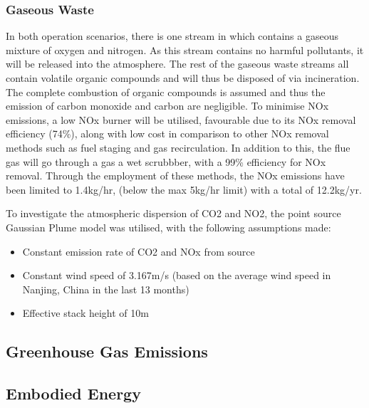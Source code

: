 


\subsubsection{Gaseous Waste}

In both operation scenarios, there is one stream in which contains a gaseous mixture of oxygen and nitrogen. As this stream contains no harmful pollutants, it will be released into the atmosphere. The rest of the gaseous waste streams all contain volatile organic compounds and will thus be disposed of via incineration. The complete combustion of organic compounds is assumed and thus the emission of carbon monoxide and carbon are negligible. To minimise NOx emissions, a low NOx burner will be utilised, favourable due to its NOx removal efficiency (74\%), along with low cost in comparison to other NOx removal methods such as fuel staging and gas recirculation. In addition to this, the flue gas will go through a gas a wet scrubbber, with a 99\% efficiency for NOx removal. Through the employment of these methods, the NOx emissions have been limited to 1.4kg/hr, (below the max 5kg/hr limit) with a total of 12.2kg/yr. 

To investigate the atmospheric dispersion of CO2 and NO2, the point source Gaussian Plume model was utilised, with the following assumptions made:

\begin{itemize}
\item Constant emission rate of CO2 and NOx from source
\item Constant wind speed of 3.167m/s (based on the average wind speed in Nanjing, China in the last 13 months)
\item  Effective stack height of 10m 
\end{itemize}







\subsection{Greenhouse Gas Emissions}

\subsection{Embodied Energy}